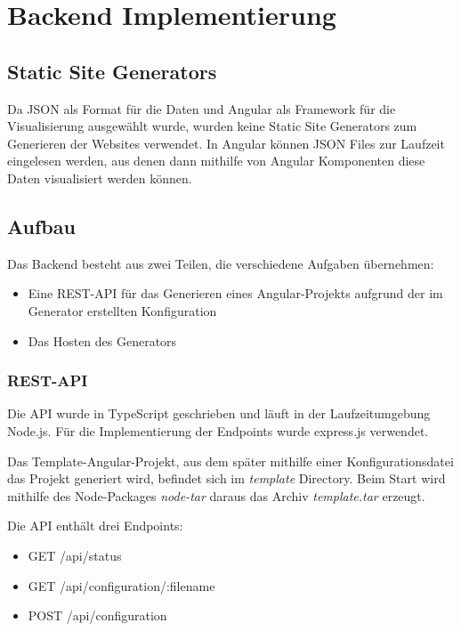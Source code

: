 \section{Backend Implementierung}

\subsection{Static Site Generators}
Da JSON als Format für die Daten und Angular als Framework für die Visualisierung ausgewählt wurde, wurden
keine Static Site Generators zum Generieren der Websites verwendet.
In Angular können JSON Files zur Laufzeit eingelesen werden, aus denen dann mithilfe von Angular Komponenten diese
Daten visualisiert werden können.

\subsection{Aufbau}
Das Backend besteht aus zwei Teilen, die verschiedene Aufgaben übernehmen:

\begin{itemize}
    \item Eine REST-API für das Generieren eines Angular-Projekts aufgrund der im Generator erstellten Konfiguration
    \item Das Hosten des Generators
\end{itemize}

\subsubsection{REST-API}
Die API wurde in TypeScript geschrieben und läuft in der Laufzeitumgebung Node.js.
Für die Implementierung der Endpoints wurde express.js verwendet.

Das Template-Angular-Projekt, aus dem später mithilfe einer Konfigurationsdatei das Projekt generiert wird,
befindet sich im \textit{template} Directory.
Beim Start wird mithilfe des Node-Packages \textit{node-tar} daraus das Archiv \textit{template.tar} erzeugt.

Die API enthält drei Endpoints:

\begin{itemize}
    \item GET /api/status
    \item GET /api/configuration/:filename
    \item POST /api/configuration
\end{itemize}

